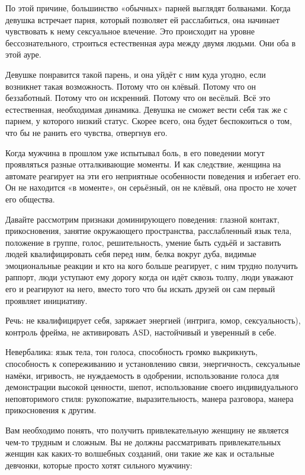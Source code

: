 По этой причине, большинство «обычных» парней выглядят болванами. Когда девушка встречает парня, который позволяет ей расслабиться, она начинает чувствовать к нему сексуальное влечение. Это происходит на уровне бессознательного, строиться естественная аура между двумя людьми. Они оба в этой ауре.

Девушке понравится такой парень, и она уйдёт с ним куда угодно, если возникнет такая возможность. Потому что он клёвый. Потому что он беззаботный. Потому что он искренний. Потому что он весёлый. Всё это естественная, необходимая динамика. Девушка не сможет вести себя так же с парнем, у которого низкий статус. Скорее всего, она будет беспокоиться о том, что бы не ранить его чувства, отвергнув его.

Когда мужчина в прошлом уже испытывал боль, в его поведении могут проявляться разные отталкивающие моменты. И как следствие, женщина на автомате реагирует на эти его неприятные особенности поведения и избегает его. Он не находится «в моменте», он серьёзный, он не клёвый, она просто не хочет его общества.

Давайте рассмотрим признаки доминирующего поведения: глазной контакт, прикосновения, занятие окружающего пространства, расслабленный язык тела, положение в группе, голос, решительность, умение быть судьёй и заставить людей квалифицировать себя перед ним, белка вокруг дуба, видимые эмоциональные реакции и кто на кого больше реагирует, с ним трудно получить раппорт, люди уступают ему дорогу когда он идёт сквозь толпу, люди уважают его и реагируют на него, вместо того что бы искать друзей он сам первый проявляет инициативу.

Речь: не квалифицирует себя, заряжает энергией (интрига, юмор, сексуальность), контроль фрейма, не активировать ASD, настойчивый и уверенный в себе.

Невербалика: язык тела, тон голоса, способность громко выкрикнуть, способность к сопереживанию и установлению связи, энергичность, сексуальные намёки, игривость, не нуждаемость в одобрении, использование голоса для демонстрации высокой ценности, шепот, использование своего индивидуального неповторимого стиля: рукопожатие, выразительность, манера разговора, манера прикосновения к другим.

Вам необходимо понять, что получить привлекательную женщину не является чем-то трудным и сложным. Вы не должны рассматривать привлекательных женщин как каких-то волшебных созданий, они такие же как и остальные девчонки, которые просто хотят сильного мужчину:

